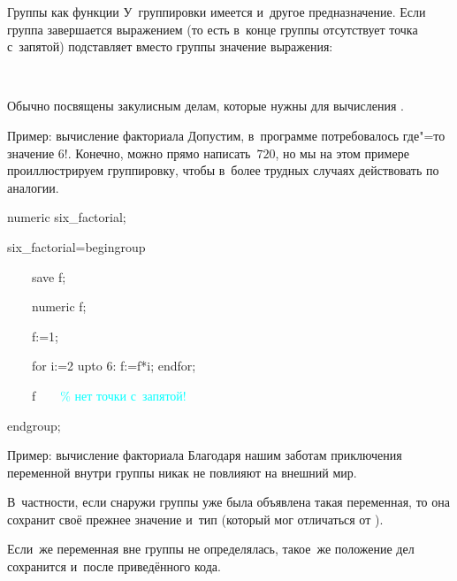 \begin{frame}{Группы как функции}
У~группировки имеется и~другое предназначение. Если группа завершается
выражением (то есть в~конце группы отсутствует точка с~запятой)
 подставляет вместо группы значение выражения:
\begin{center}
\LARGE
{}~
\end{center}

Обычно  посвящены закулисным делам, которые нужны для
вычисления .
\end{frame}


\begin{frame}{Пример: вычисление факториала}
Допустим, в~программе потребовалось где"=то значение $6!$. Конечно, можно прямо
написать~$720$, но мы на этом примере проиллюстрируем группировку, чтобы
в~более трудных случаях действовать по аналогии.
\begin{programlisting}
numeric six\_factorial;\par
six\_factorial=begingroup\par
~~~~save f;\par
~~~~numeric f;\par
~~~~f:=1;\par
~~~~for i:=2 upto 6: f:=f*i; endfor;\par
~~~~\alert{f}~~~~\textcolor{cyan}{\% нет точки с~запятой!}\par
endgroup;
\end{programlisting}
\end{frame}


\begin{frame}{Пример: вычисление факториала}
Благодаря нашим заботам приключения переменной  внутри группы никак
не повлияют на внешний мир.

В~частности, если снаружи группы уже была объявлена такая переменная, то она
сохранит своё прежнее значение и~тип (который мог отличаться от
).

Если~же переменная  вне группы не определялась, такое~же положение
дел сохранится и~после приведённого кода.
\end{frame}


